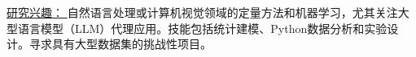  \small{ \underline{研究兴趣： }  自然语言处理或计算机视觉领域的定量方法和机器学习，尤其关注大型语言模型（LLM）代理应用。技能包括统计建模、Python数据分析和实验设计。寻求具有大型数据集的挑战性项目。}
